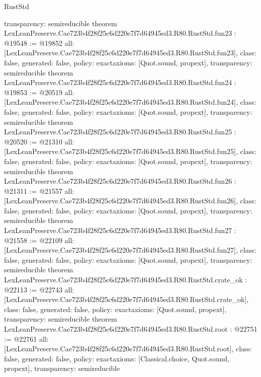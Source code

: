 \begin{lexlean}{RustStd}
\begin{coremodule}
{  transparency: semireducible
}
theorem LexLeanPreserve.Cae723b4f28f25c6d220e7f7d64945ed3.R80.RustStd.fun23 : @19548 := @19852 {
  all: [LexLeanPreserve.Cae723b4f28f25c6d220e7f7d64945ed3.R80.RustStd.fun23],
  class: false,
  generated: false,
  policy: exact{axioms: [Quot.sound, propext]},
  transparency: semireducible
}
theorem LexLeanPreserve.Cae723b4f28f25c6d220e7f7d64945ed3.R80.RustStd.fun24 : @19853 := @20519 {
  all: [LexLeanPreserve.Cae723b4f28f25c6d220e7f7d64945ed3.R80.RustStd.fun24],
  class: false,
  generated: false,
  policy: exact{axioms: [Quot.sound, propext]},
  transparency: semireducible
}
theorem LexLeanPreserve.Cae723b4f28f25c6d220e7f7d64945ed3.R80.RustStd.fun25 : @20520 := @21310 {
  all: [LexLeanPreserve.Cae723b4f28f25c6d220e7f7d64945ed3.R80.RustStd.fun25],
  class: false,
  generated: false,
  policy: exact{axioms: [Quot.sound, propext]},
  transparency: semireducible
}
theorem LexLeanPreserve.Cae723b4f28f25c6d220e7f7d64945ed3.R80.RustStd.fun26 : @21311 := @21557 {
  all: [LexLeanPreserve.Cae723b4f28f25c6d220e7f7d64945ed3.R80.RustStd.fun26],
  class: false,
  generated: false,
  policy: exact{axioms: [Quot.sound, propext]},
  transparency: semireducible
}
theorem LexLeanPreserve.Cae723b4f28f25c6d220e7f7d64945ed3.R80.RustStd.fun27 : @21558 := @22109 {
  all: [LexLeanPreserve.Cae723b4f28f25c6d220e7f7d64945ed3.R80.RustStd.fun27],
  class: false,
  generated: false,
  policy: exact{axioms: [Quot.sound, propext]},
  transparency: semireducible
}
theorem LexLeanPreserve.Cae723b4f28f25c6d220e7f7d64945ed3.R80.RustStd.crate_ok : @22113 := @22743 {
  all: [LexLeanPreserve.Cae723b4f28f25c6d220e7f7d64945ed3.R80.RustStd.crate_ok],
  class: false,
  generated: false,
  policy: exact{axioms: [Quot.sound, propext]},
  transparency: semireducible
}
theorem LexLeanPreserve.Cae723b4f28f25c6d220e7f7d64945ed3.R80.RustStd.root : @22751 := @22761 {
  all: [LexLeanPreserve.Cae723b4f28f25c6d220e7f7d64945ed3.R80.RustStd.root],
  class: false,
  generated: false,
  policy: exact{axioms: [Classical.choice, Quot.sound, propext]},
  transparency: semireducible
}


\end{coremodule}
\end{lexlean}
